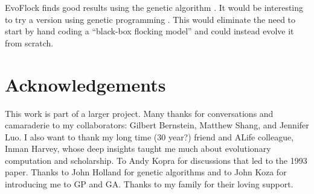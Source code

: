 \documentclass[letterpaper]{article}
\begin{document}
EvoFlock finds good results using the genetic algorithm \citep{holland_adaptation_1975}. It would be interesting to try a version using genetic programming \citep{koza_genetic_1992}. This would eliminate the need to start by hand coding a ``black-box flocking model'' and could instead evolve it from scratch.

\section{Acknowledgements}
\label{sec:ack}

This work is part of a larger project. Many thanks for conversations and camaraderie to my collaborators: Gilbert Bernstein, Matthew Shang, and Jennifer Luo. I also want to thank my long time (30 year?) friend and ALife colleague, Inman Harvey, whose deep insights taught me much about evolutionary computation and scholarship. To Andy Kopra for discussions that led to the 1993 paper. Thanks to John Holland for genetic algorithms and to John Koza for introducing me to GP and GA. Thanks to my family for their loving support.






\end{document}
